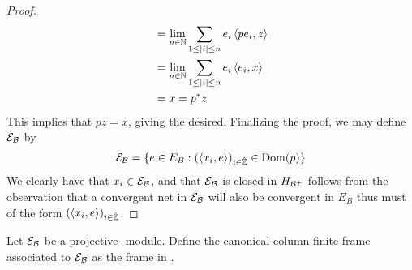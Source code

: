 \begin{proof}
\begin{align*}
		&=\lim_{n\in \mathbb{N}} \sum_{1\leq |i|\leq n} e_i \left \langle pe_i,z \right \rangle \\
		&=\lim_{n\in \mathbb{N}} \sum_{1\leq |i|\leq n} e_i \left \langle e_i,x \right \rangle \\
		&=x=p^*z
	\end{align*}
	This implies that $pz=x$, giving the desired. 
	Finalizing the proof, we may define $\mathcal{E}_{\mathcal{B}}$ by
	\begin{align*}
		\mathcal{E}_{\mathcal{B}}=\{e \in E_B : (\left \langle x_i,e \right \rangle)_{i\in \hat{\mathbb{Z}}}\in \operatorname{Dom} (p)\}
	\end{align*}
	We clearly have that $x_i\in \mathcal{E}_{\mathcal{B}}$, and that $\mathcal{E}_{\mathcal{B}}$ is closed in $H_{\mathcal{B}^+}$ follows from the observation that a convergent net in $\mathcal{E}_{\mathcal{B}}$ will also be convergent in $E_B$ thus must of the form $(\left \langle x_i,e \right \rangle)_{i\in \hat{\mathbb{Z}}}$. 
\end{proof}
\begin{definition}
	Let $\mathcal{E}_{\mathcal{B}}$ be a projective \Cstar-module. Define the canonical column-finite frame associated to $\mathcal{E}_{\mathcal{B}}$ as the frame in .
\end{definition}

